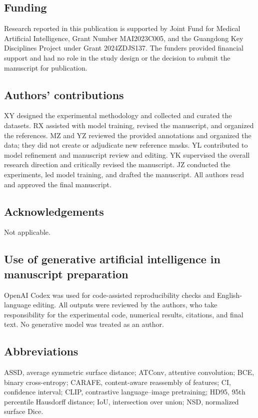 \subsection*{Funding}
Research reported in this publication is supported by Joint Fund for Medical Artificial
Intelligence, Grant Number MAI2023C005, and the Guangdong Key Disciplines Project under
Grant 2024ZDJS137. The funders provided financial support and had no role in the study
design or the decision to submit the manuscript for publication.

\subsection*{Authors' contributions}
XY designed the experimental methodology and collected and curated the datasets.
RX assisted with model training, revised the manuscript, and organized the
references. MZ and YZ reviewed the provided annotations and organized the data;
they did not create or adjudicate new reference masks. YL contributed to model
refinement and manuscript review and editing. YK supervised the overall research
direction and critically revised the manuscript. JZ conducted the experiments,
led model training, and drafted the manuscript. All authors read and approved
the final manuscript.

\subsection*{Acknowledgements}
Not applicable.

\subsection*{Use of generative artificial intelligence in manuscript preparation}
OpenAI Codex was used for code-assisted reproducibility checks and English-language
editing. All outputs were reviewed by the authors, who take responsibility for
the experimental code, numerical results, citations, and final text. No
generative model was treated as an author.

\subsection*{Abbreviations}
ASSD, average symmetric surface distance; ATConv, attentive convolution; BCE,
binary cross-entropy; CARAFE, content-aware reassembly of features; CI,
confidence interval; CLIP, contrastive language--image pretraining; HD95, 95th
percentile Hausdorff distance; IoU, intersection over union; NSD, normalized
surface Dice.
